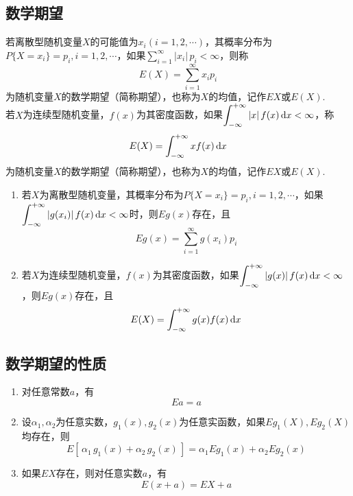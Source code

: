 \subsection{数学期望}
若离散型随机变量$X$的可能值为$x_i (i=1,2,\cdots)$，其概率分布为$P\lbrace X=x_i \rbrace =p_i,i=1,2,\cdots $，如果$\displaystyle \sum_{i=1}^{\infty }|x_i|\,p_i<\infty $，则称
\begin{equation}
 E(X)=\sum_{i=1}^{\infty }x_ip_i
\end{equation} 
为随机变量$X$的数学期望（简称期望），也称为$X$的均值，记作$EX$或$E(X)$.\jg\\
若$X$为连续型随机变量，$f(x)$为其密度函数，如果$\displaystyle \int_{-\infty}^{+\infty }|x|\,f(x)\,{\rm{d}} x<\infty $，称
\begin{equation}
E(X)=\int_{-\infty}^{+\infty }xf(x)\,{\rm{d}} x
\end{equation} 
为随机变量$X$的数学期望（简称期望），也称为$X$的均值，记作$EX$或$E(X)$.\jg\\
\sj
\begin{enumerate}[1.]
	\setlength{\itemindent}{2em}
	\setlength{\topsep}{0.01em}
	\setlength{\itemsep}{0.01em}
\item 若$X$为离散型随机变量，其概率分布为$P\lbrace X=x_i \rbrace =p_i,i=1,2,\cdots $，如果$\displaystyle \int_{-\infty}^{+\infty }|g(x_i)|\,f(x)\,{\rm{d}} x<\infty $时，则$Eg(x)$存在，且
\begin{equation}
Eg(x)=\sum_{i=1}^{\infty }g(x_i)p_i
\end{equation} 
\item 若$X$为连续型随机变量，$f(x)$为其密度函数，如果$\displaystyle \int_{-\infty}^{+\infty }|g(x)|\,f(x)\,{\rm{d}} x<\infty $，则$Eg(x)$存在，且
\begin{equation}
E(X)=\int_{-\infty}^{+\infty }g(x)f(x)\,{\rm{d}} x
\end{equation} 
\end{enumerate}

\subsection{数学期望的性质}
\begin{enumerate}
	\setlength{\itemindent}{2em}
	\setlength{\topsep}{0.01em}
	\setlength{\itemsep}{0.01em}
	\item 对任意常数$a$，有
	\begin{equation}
	Ea=a
 	\end{equation}
	\item 设$\alpha_1,\alpha_2$为任意实数，$g_1 (x),g_2 (x)$为任意实函数，如果$Eg_1 (X),Eg_2 (X)$均存在，则
	\begin{equation}
	E[\,\alpha_1\,g_1(x)+\alpha_2\,g_2(x)\,]=\alpha_1Eg_1(x)+\alpha_2Eg_2(x)
	\end{equation}
	\item 如果$EX$存在，则对任意实数$a$，有
	\begin{equation}
	E(x+a)=EX+a
	\end{equation}
\end{enumerate}

